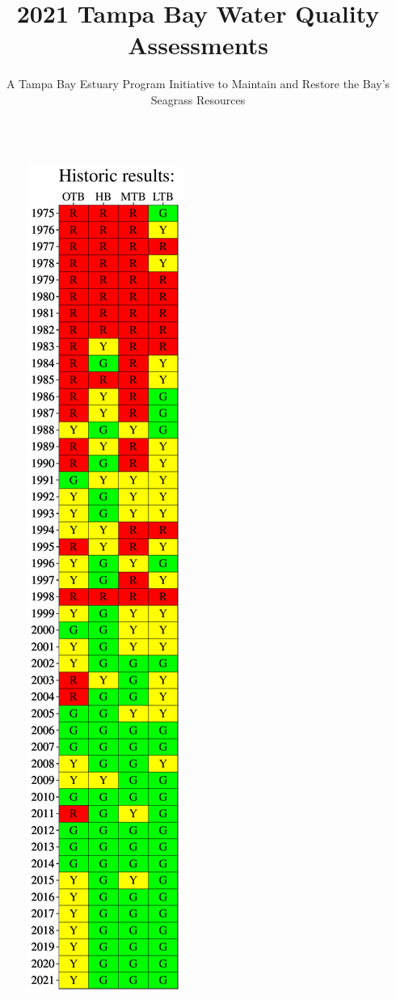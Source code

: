 \documentclass[final,t]{beamer}\usepackage[]{graphicx}\usepackage[]{color}
\title{\Large 2021 Tampa Bay Water Quality Assessments}
\author{\normalsize A Tampa Bay Estuary Program Initiative to Maintain and Restore the Bay's Seagrass Resources}
\begin{document}
\begin{frame}

\vspace{-0.4cm} %
\begin{columns}[t]

\begin{column}{.2\linewidth}

\vspace{-0.2in}


\begin{figure}
\centerline{\includegraphics[trim = 0cm 0cm 0cm 0cm, width=1.1\linewidth]{figure/attainmat.pdf}}

\end{figure}
\end{column}
\end{columns}
\end{frame}
\end{document}
